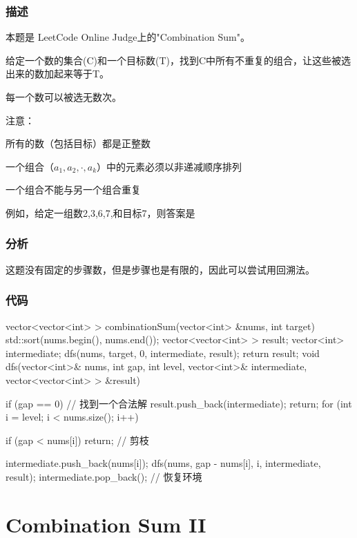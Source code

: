 \subsubsection{描述}
本题是 LeetCode Online Judge上的"Combination Sum"。

给定一个数的集合(C)和一个目标数(T)，找到C中所有不重复的组合，让这些被选出来的数加起来等于T。

每一个数可以被选无数次。

注意：
\begindot
\item 所有的数（包括目标）都是正整数
\item 一个组合（$a_1,a_2,\cdot,a_k$）中的元素必须以非递减顺序排列
\item 一个组合不能与另一个组合重复
\myenddot

例如，给定一组数2,3,6,7,和目标7，则答案是
\begin{Code}
[7]
[2, 2, 3] 
\end{Code}

\subsubsection{分析}
这题没有固定的步骤数，但是步骤也是有限的，因此可以尝试用回溯法。

\subsubsection{代码}

\begin{Codex}[label=combination_sum.cpp]
    vector<vector<int> > combinationSum(vector<int> &nums, int target) {
        std::sort(nums.begin(), nums.end());
        vector<vector<int> > result;
        vector<int> intermediate;
        dfs(nums, target, 0, intermediate, result);
        return result;
    }
    void dfs(vector<int>& nums, int gap, int level,
            vector<int>& intermediate, vector<vector<int> > &result) {
        if (gap == 0) {  // 找到一个合法解
            result.push_back(intermediate);
            return;
        }
        for (int i = level; i < nums.size(); i++) {
            if (gap < nums[i]) return; // 剪枝

            intermediate.push_back(nums[i]);
            dfs(nums, gap - nums[i], i, intermediate, result);
            intermediate.pop_back();  // 恢复环境
        }
    }
\end{Codex}


\section{Combination Sum II} %

